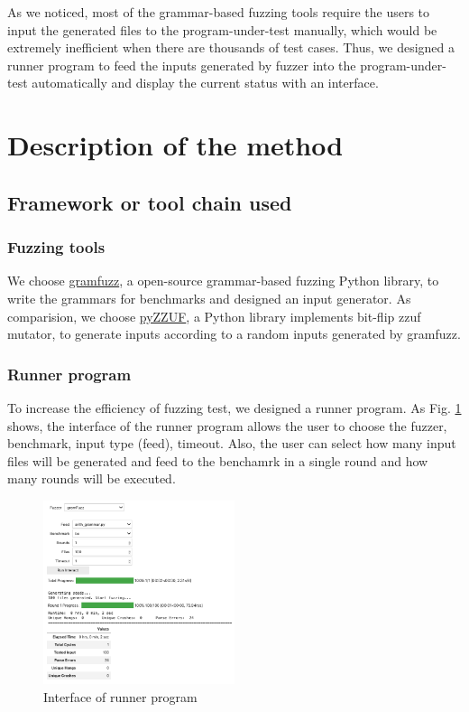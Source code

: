 \documentclass[11pt,a4paper]{article}
\begin{document}
As we noticed, most of the grammar-based fuzzing tools require the users to input the generated files to the program-under-test manually, which would be extremely inefficient when there are thousands of test cases. Thus, we designed a runner program to feed the inputs generated by fuzzer into the program-under-test automatically and display the current status with an interface.

\section{Description of the method}
\subsection{Framework or tool chain used}
\subsubsection{Fuzzing tools}
We choose \href{https://d0c-s4vage.github.io/gramfuzz/}{\cc gramfuzz}, a open-source grammar-based fuzzing Python library, to write the grammars for benchmarks and designed an input generator. As comparision, we choose \href{https://pypi.org/project/pyZZUF/}{\cc pyZZUF}, a Python library implements bit-flip zzuf mutator, to generate inputs according to a random inputs generated by {\cc gramfuzz}. 
%
\subsubsection{Runner program}
To increase the efficiency of fuzzing test, we designed a runner program. As Fig. \ref{ui} shows, the interface of the runner program allows the user to choose the fuzzer, benchmark, input type (feed), timeout. Also, the user can select how many input files will be generated and feed to the benchamrk in a single round and how many rounds will be executed. 
\begin{figure}[H]
    \centering
    \includegraphics[width=0.5\textwidth]{ui.png}
    \caption{Interface of runner program}
    \label{ui}
\end{figure}
\end{document}
